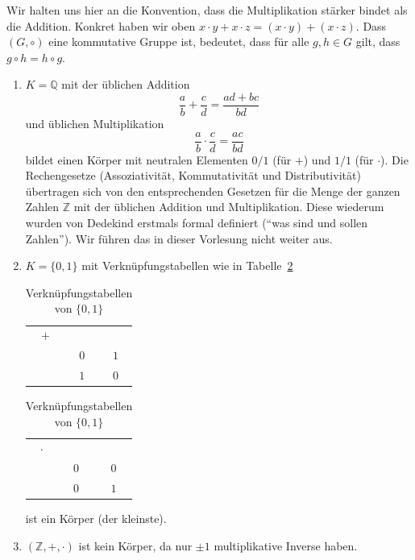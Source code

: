 \documentclass[../main.tex]{subfiles}
\begin{document}
Wir halten uns hier an die Konvention, dass die Multiplikation stärker
bindet als die Addition. Konkret haben wir oben
\( x \cdot y + x \cdot z = (x \cdot y) + (x \cdot z)\).
Dass $(G, \circ)$ eine kommutative Gruppe ist, bedeutet,
dass für alle $g, h \in G$ gilt, dass $g \circ h = h \circ g$.

\begin{examples}
  \leavevmode
  \begin{enumerate}[(1)]
    \item $K = \mathbb Q$ mit der üblichen Addition
      \[ \frac{a}{b} + \frac{c}{d} = \frac{ad + bc}{bd}\]
      und üblichen Multiplikation
      \[ \frac{a}{b} \cdot \frac{c}{d} = \frac{ac}{bd}\]
      bildet einen Körper mit neutralen Elementen $0/1$ (für $+$) und $1/1$ (für $\cdot$).
      Die Rechengesetze (Assoziativität, Kommutativität und Distributivität) übertragen
      sich von den entsprechenden Gesetzen für die Menge der ganzen Zahlen $\mathbb Z$
      mit der üblichen Addition und Multiplikation.
      Diese wiederum wurden von Dedekind erstmals formal definiert (``was
      sind und sollen Zahlen'').
      Wir
      führen das in dieser Vorlesung nicht weiter aus.
    \item $K = \{0, 1\}$ mit Verknüpfungstabellen
      wie in Tabelle~\ref{tab:01}
      \begin{table}[htb]
        \centering
        \begin{minipage}{0.25\linewidth}
          \centering
        \begin{tabular}[h]{ccc}
         $+$ & \color{gray}{$0$} & \color{gray}{$1$}\\
        \color{gray}{$0$} & $0$ & $1$ \\
        \color{gray}{$1$} & $1$ & $0$
        \end{tabular}%
        \end{minipage}%
        \begin{minipage}{0.25\linewidth}
          \centering
        \begin{tabular}[h]{ccc}
          $\cdot$ & \color{gray}{$0$} & \color{gray}{$1$} \\
          \color{gray}{$0$} & $0$ & $0$ \\
          \color{gray}{$1$} & $0$ & $1$
        \end{tabular}
      \end{minipage}
      \caption{Verknüpfungstabellen von $\{0, 1\}$}%
      \label{tab:01}
      \end{table}
      ist ein Körper (der kleinste).
    \item $(\mathbb Z, + , \cdot)$ ist kein Körper, da nur $\pm 1$ multiplikative
      Inverse haben.
  \end{enumerate}
\end{examples}
\end{document}
